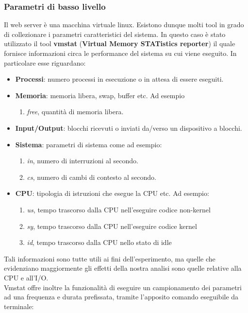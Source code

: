 \subsubsection{Parametri di basso livello}
Il web server è una macchina virtuale linux. Esistono dunque molti tool in grado di collezionare i parametri caratteristici del sistema. In questo caso è stato utilizzato il tool \textbf{vmstat} (\textbf{Virtual Memory STATistics reporter}) il quale fornisce informazioni circa le performance del sistema su cui viene eseguito. In particolare esse riguardano:
\begin{itemize}
	\item \textbf{Processi}: numero processi in esecuzione o in attesa di essere eseguiti.
	\item \textbf{Memoria}: memoria libera, swap, buffer etc. Ad esempio
		\begin{enumerate}
			\item \textit{free}, quantità di memoria libera.
		\end{enumerate}
	
	\item \textbf{Input/Output}: blocchi ricevuti o inviati da/verso un dispositivo a blocchi.
	\item \textbf{Sistema}: parametri di sistema come ad esempio:
		\begin{enumerate}
			\item \textit{in}, numero di interruzioni al secondo.
			\item \textit{cs}, numero di cambi di contesto al secondo.
		\end{enumerate}
	\item \textbf{CPU}: tipologia di istruzioni che esegue la CPU etc. Ad esempio:
		\begin{enumerate}
			\item \textit{us}, tempo trascorso dalla CPU nell'eseguire codice non-kernel
			\item \textit{sy}, tempo trascorso dalla CPU nell'eseguire codice kernel
			\item \textit{id}, tempo trascorso dalla CPU nello stato di idle
		\end{enumerate}
\end{itemize}
Tali informazioni sono tutte utili ai fini dell'esperimento, ma quelle che evidenziano maggiormente gli effetti della nostra analisi sono quelle relative alla CPU e all'I/O.
\\
Vmstat offre inoltre la funzionalità di eseguire un campionamento dei parametri ad una frequenza e durata prefissata, tramite l'apposito comando eseguibile da terminale:
